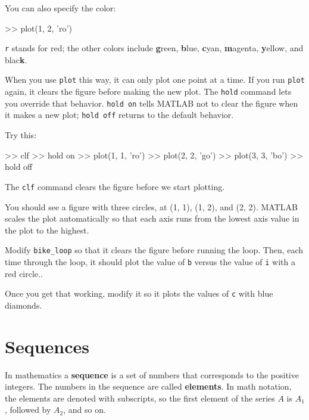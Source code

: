 \documentclass[main.tex]{subfiles}
\begin{document}
You can also specify the color:

\begin{code}
>> plot(1, 2, 'ro')
\end{code}

{\tt r} stands for red; the other colors include {\bf g}reen, {\bf
b}lue, {\bf c}yan, {\bf m}agenta, {\bf y}ellow, and blac{\bf k}.

When you use {\tt plot} this way, it can only plot one point at a
time.  If you run {\tt plot} again, it clears the figure before making
the new plot.  The {\tt hold} command lets you override that behavior.
{\tt hold on} tells MATLAB not to clear the figure when it makes a new
plot; {\tt hold off} returns to the default behavior.


Try this:

\begin{code}
>> clf
>> hold on
>> plot(1, 1, 'ro')
>> plot(2, 2, 'go')
>> plot(3, 3, 'bo')
>> hold off
\end{code}

The {\tt clf} command clears the figure before we start plotting.


You should see a figure with three circles, at (1, 1), (1, 2), and (2, 2).  MATLAB scales the plot automatically so that each axis runs from the lowest axis value in the plot to the highest.

\begin{ex}
Modify \verb"bike_loop" so that it clears the figure before running the loop.  Then, each time through the
loop, it should plot the value of {\tt b} versus the value of {\tt i} with a red circle..

Once you get that working, modify it so it plots the values of {\tt c} with blue diamonds.
\end{ex}


\section{Sequences}

In mathematics a {\bf sequence} is a set of numbers that corresponds
to the positive integers.  The numbers in the sequence are
called {\bf elements}.  In math notation, the elements
are denoted with subscripts, so the first element of the series $A$ is
$A_1$, followed by $A_2$, and so on.

\end{document}

